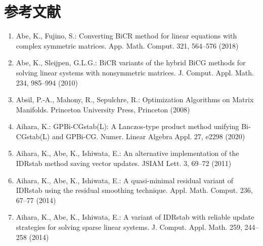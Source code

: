 \clearpage\section*{{参考文献}}
\makeatletter{}\label{chap:references}\makeatother{}
\begin{enumerate}[label=\arabic*.,ref=\arabic*,leftmargin=3em]

\item\label{bib:source-1}Abe, K., Fujino, S.: Converting BiCR method for linear equations with complex symmetric matrices. App. Math. Comput. 321, 564–576 (2018)

\item\label{bib:source-2}Abe, K., Sleijpen, G.L.G.: BiCR variants of the hybrid BiCG methods for solving linear systems with nonsymmetric matrices. J. Comput. Appl. Math. 234, 985–994 (2010)

\item\label{bib:source-3}Absil, P.-A., Mahony, R., Sepulchre, R.: Optimization Algorithms on Matrix Manifolds. Princeton University Press, Princeton (2008)

\item\label{bib:source-4}Aihara, K.: GPBi-CGstab(L): A Lanczos-type product method unifying Bi-CGstab(L) and GPBi-CG. Numer. Linear Algebra Appl. 27, e2298 (2020)

\item\label{bib:source-5}Aihara, K., Abe, K., Ishiwata, E.: An alternative implementation of the IDRstab method saving vector updates. JSIAM Lett. 3, 69–72 (2011)

\item\label{bib:source-6}Aihara, K., Abe, K., Ishiwata, E.: A quasi-minimal residual variant of IDRstab using the residual smoothing technique. Appl. Math. Comput. 236, 67–77 (2014)

\item\label{bib:source-7}Aihara, K., Abe, K., Ishiwata, E.: A variant of IDRstab with reliable update strategies for solving sparse linear systems. J. Comput. Appl. Math. 259, 244–258 (2014)


\end{enumerate}
